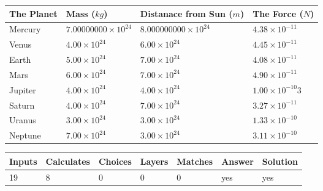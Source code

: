 \documentclass[12pt]{article}
\begin{document}
\vspace{0.2in}
 
 
\begin{tabular}{|l|l|l|l|}
\hline
The Planet & Mass ($kg$) & Distanace from Sun ($m$) & The Force ($N$)\\
\hline
Mercury  &
           $ %
7.00000000 \times 10^{24}  $   &
             $ %
8.000000000 \times 10^{24}$    & $ %
4.38 \times 10^{-11} $
\\  \hline
Venus    &
           $  %
4.00 \times 10^{24}  $     &
             $ %
6.00 \times 10^{24} $    & $ %
4.45 \times 10^{-11} $
\\  \hline
Earth    &
           $  %
5.00 \times 10^{24}$     &
             $ %
7.00 \times 10^{24} $    & $ %
4.08 \times 10^{-11} $
\\   \hline
Mars     &
           $  %
6.00 \times 10^{24} $     &
             $ %
7.00 \times 10^{24}$    & $ %
4.90 \times 10^{-11} $
\\   \hline
Jupiter  &
           $  %
4.00 \times 10^{24}  $    &
             $ %
4.00 \times 10^{24} $    & $ %
1.00 \times 10^{-10}3 $
\\  \hline
Saturn   &
           $  %
4.00 \times 10^{24}   $    &
             $ %
7.00 \times 10^{24}  $    & $ %
3.27 \times 10^{-11} $
\\  \hline
Uranus   &
           $  %
3.00 \times 10^{24} $    &
             $ %
3.00 \times 10^{24}$    & $ %
1.33 \times 10^{-10} $
\\  \hline
Neptune  &
           $  %
7.00 \times 10^{24}  $    &
             $ %
3.00 \times 10^{24} $    & $ %
3.11 \times 10^{-10} $
\\  \hline
 
\end{tabular}
 
 
 
 
\noindent{}
 
 

 
\vspace{0.3in}
   
   
   
   
\noindent\begin{tabular}{|l|l|l|l|l|l|l|}
 \hline
Inputs & Calculates & Choices & Layers & Matches & Answer & Solution \\ \hline
          19 & 
           8 & 
           0
  & 
           0 & 
           0 & 
  yes & 
  yes 
  \\ \hline
 \end{tabular}
   
\end{document}
